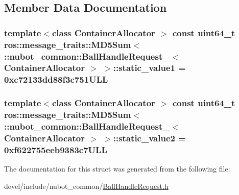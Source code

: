 \subsection{Member Data Documentation}
\hypertarget{structros_1_1message__traits_1_1MD5Sum_3_01_1_1nubot__common_1_1BallHandleRequest___3_01ContainerAllocator_01_4_01_4_aebf203e5496741b738e0d0a379603499}{
\subsubsection[{static\-\_\-value1}]{\setlength{\rightskip}{0pt plus 5cm}template$<$class Container\-Allocator $>$ const uint64\-\_\-t ros\-::message\-\_\-traits\-::\-M\-D5\-Sum$<$ \-::{\bf nubot\-\_\-common\-::\-Ball\-Handle\-Request\-\_\-}$<$ Container\-Allocator $>$ $>$\-::static\-\_\-value1 = 0xc72133dd88f3c751\-U\-L\-L\hspace{0.3cm}{\ttfamily [static]}}}\label{structros_1_1message__traits_1_1MD5Sum_3_01_1_1nubot__common_1_1BallHandleRequest___3_01ContainerAllocator_01_4_01_4_aebf203e5496741b738e0d0a379603499}
\hypertarget{structros_1_1message__traits_1_1MD5Sum_3_01_1_1nubot__common_1_1BallHandleRequest___3_01ContainerAllocator_01_4_01_4_ad3eaea3675b75b22286a974fcb165357}{
\subsubsection[{static\-\_\-value2}]{\setlength{\rightskip}{0pt plus 5cm}template$<$class Container\-Allocator $>$ const uint64\-\_\-t ros\-::message\-\_\-traits\-::\-M\-D5\-Sum$<$ \-::{\bf nubot\-\_\-common\-::\-Ball\-Handle\-Request\-\_\-}$<$ Container\-Allocator $>$ $>$\-::static\-\_\-value2 = 0xf622755eeb9383c7\-U\-L\-L\hspace{0.3cm}{\ttfamily [static]}}}\label{structros_1_1message__traits_1_1MD5Sum_3_01_1_1nubot__common_1_1BallHandleRequest___3_01ContainerAllocator_01_4_01_4_ad3eaea3675b75b22286a974fcb165357}


The documentation for this struct was generated from the following file\-:\begin{DoxyCompactItemize}
\item 
devel/include/nubot\-\_\-common/\hyperlink{BallHandleRequest_8h}{Ball\-Handle\-Request.\-h}\end{DoxyCompactItemize}
